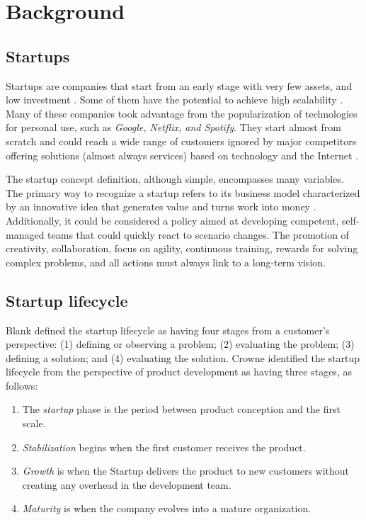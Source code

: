\documentclass[runningheads]{llncs}
\begin{document}
\section{Background} 
\label{section:background}

\subsection{Startups}
Startups are companies that start from an early stage with very few assets, and low investment \cite{Blank2020,Giardino2016,Giardino2014software}. Some of them have the potential to achieve high scalability \cite{Unterkalmsteiner2016}. Many of these companies took advantage 
from the popularization of technologies for personal use, such as \textit{Google, Netflix, and Spotify}. They start almost from scratch \cite{Giardino2014framework,SouzaMA2017,SouzaRM2019sbqs} and could reach a wide range of customers ignored by major competitors offering solutions (almost always services) based on technology and the Internet \cite{Chanin2017}.

The startup concept definition, although simple, encompasses many variables. The primary way to recognize a startup refers to its business model characterized by an innovative idea that generates value and turns work into money \cite{Dash2019}. Additionally, it could be considered a policy aimed at developing competent, self-managed teams that could quickly react to scenario changes. The promotion of creativity, collaboration, focus on agility, continuous training, rewards for solving complex problems, and all actions must always link to a long-term vision.

\subsection{Startup lifecycle}

Blank \cite{Blank2020} defined the startup lifecycle as having four stages from a customer's perspective: (1) defining or observing a problem; (2) evaluating the problem; (3) defining a solution; and (4) evaluating the solution. Crowne \cite{Crowne2002} identified the startup lifecycle from the perspective of product development as having three stages, as follows:

\begin{enumerate}
    \item The \textit{startup} phase is the period between product conception and the first scale.
    \item \textit{Stabilization} begins when the first customer receives the product.
    \item \textit{Growth} is when the Startup delivers the product to new customers without creating any overhead in the development team.
    \item \textit{Maturity} is when the company evolves into a mature organization.
\end{enumerate}
\end{document}
